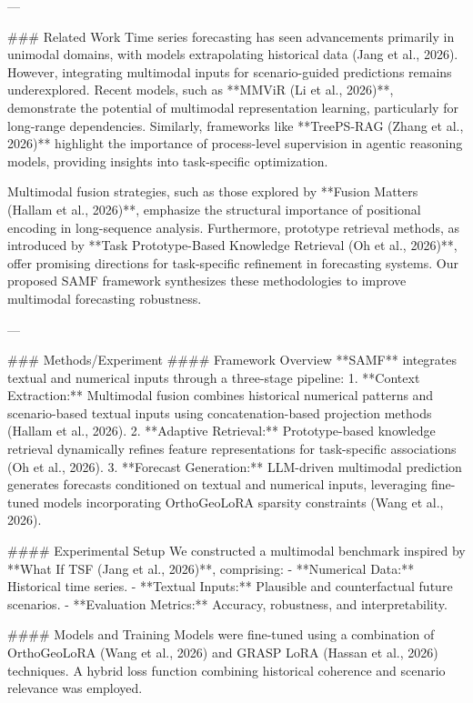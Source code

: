 ---

### Related Work  
Time series forecasting has seen advancements primarily in unimodal domains, with models extrapolating historical data (Jang et al., 2026). However, integrating multimodal inputs for scenario-guided predictions remains underexplored. Recent models, such as **MMViR (Li et al., 2026)**, demonstrate the potential of multimodal representation learning, particularly for long-range dependencies. Similarly, frameworks like **TreePS-RAG (Zhang et al., 2026)** highlight the importance of process-level supervision in agentic reasoning models, providing insights into task-specific optimization.

Multimodal fusion strategies, such as those explored by **Fusion Matters (Hallam et al., 2026)**, emphasize the structural importance of positional encoding in long-sequence analysis. Furthermore, prototype retrieval methods, as introduced by **Task Prototype-Based Knowledge Retrieval (Oh et al., 2026)**, offer promising directions for task-specific refinement in forecasting systems. Our proposed SAMF framework synthesizes these methodologies to improve multimodal forecasting robustness.

---

### Methods/Experiment  
#### Framework Overview  
**SAMF** integrates textual and numerical inputs through a three-stage pipeline:  
1. **Context Extraction:** Multimodal fusion combines historical numerical patterns and scenario-based textual inputs using concatenation-based projection methods (Hallam et al., 2026).  
2. **Adaptive Retrieval:** Prototype-based knowledge retrieval dynamically refines feature representations for task-specific associations (Oh et al., 2026).  
3. **Forecast Generation:** LLM-driven multimodal prediction generates forecasts conditioned on textual and numerical inputs, leveraging fine-tuned models incorporating OrthoGeoLoRA sparsity constraints (Wang et al., 2026).

#### Experimental Setup  
We constructed a multimodal benchmark inspired by **What If TSF (Jang et al., 2026)**, comprising:  
- **Numerical Data:** Historical time series.  
- **Textual Inputs:** Plausible and counterfactual future scenarios.  
- **Evaluation Metrics:** Accuracy, robustness, and interpretability.

#### Models and Training  
Models were fine-tuned using a combination of OrthoGeoLoRA (Wang et al., 2026) and GRASP LoRA (Hassan et al., 2026) techniques. A hybrid loss function combining historical coherence and scenario relevance was employed.

